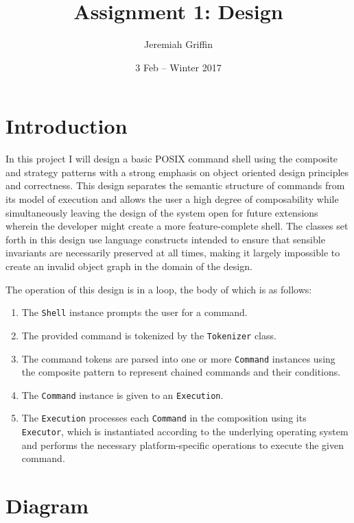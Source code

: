 \documentclass{article}
\title{Assignment 1: Design}
\date{3 Feb -- Winter 2017}
\author{Jeremiah Griffin}
\begin{document}
  \lstset{
    language=C++,
    basicstyle=\ttfamily
  }

  \maketitle
  \newpage

  \section{Introduction}

  In this project I will design a basic POSIX command shell using the
  composite and strategy patterns with a strong emphasis on object
  oriented design principles and correctness.  This design separates the
  semantic structure of commands from its model of execution and allows
  the user a high degree of composability while simultaneously leaving
  the design of the system open for future extensions wherein the
  developer might create a more feature-complete shell.  The classes set
  forth in this design use language constructs intended to ensure that
  sensible invariants are necessarily preserved at all times, making it
  largely impossible to create an invalid object graph in the domain of
  the design.

  The operation of this design is in a loop, the body of which is as
  follows:

  \begin{enumerate}
    \item The \texttt{Shell} instance prompts the user for a command.
    \item The provided command is tokenized by the
      \texttt{Tokenizer} class.
    \item The command tokens are parsed into one or more
      \texttt{Command} instances using the composite pattern to
      represent chained commands and their conditions.
    \item The \texttt{Command} instance is given to an
      \texttt{Execution}.
    \item The \texttt{Execution} processes each \texttt{Command} in the
      composition using its \texttt{Executor}, which is instantiated
      according to the underlying operating system and performs the
      necessary platform-specific operations to execute the given
      command.
  \end{enumerate}

  \section{Diagram}
\end{document}
